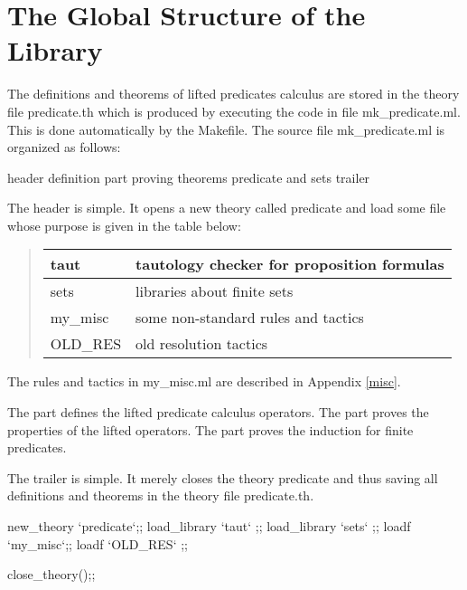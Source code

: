 \chapter{The Global Structure of the Library}
\label{global}

The definitions and theorems of lifted predicates calculus are stored
in the theory file \code{}predicate.th\edoc{} which is produced by executing the
code in file \code{}mk_predicate.ml\edoc{}. This is done automatically by the
\code{}Makefile\edoc{}.  The source file \code{}mk_predicate.ml\edoc{} is organized as
follows:

\enddocs
{}
\endmoddef
\LA{}header\RA{}
\LA{}definition part\RA{}
\LA{}proving theorems\RA{}
\LA{}predicate and sets\RA{}
\LA{}trailer\RA{}
\endcode
{}


The header is simple. It opens a new theory called \code{}predicate\edoc{} and
load some file whose purpose is given in the table below:

\begin{quote}
    \begin{tabular}{|l|l|} \hline
     \code{}taut\edoc{} & tautology checker for proposition formulas \\ \hline
     \code{}sets\edoc{} & libraries about finite sets \\ \hline
     \code{}my_misc\edoc{} & some non-standard rules and tactics \\ \hline
     \code{}OLD_RES\edoc{} & old resolution tactics \\ \hline
    \end{tabular}
\end{quote}

The rules and tactics in \code{}my_misc.ml\edoc{} are described in Appendix
\ref{misc}.  


The  part defines the lifted predicate
calculus operators. The  part proves the
properties of the lifted operators. The  part
proves the induction for finite predicates.

The trailer is simple. It merely closes the theory \code{}predicate\edoc{} and
thus saving all definitions and theorems in the theory file
\code{}predicate.th\edoc{}.

\enddocs
{}
\endmoddef
new_theory `predicate`;;
load_library `taut` ;;
load_library `sets` ;;
loadf `my_misc`;;
loadf `OLD_RES` ;;

\endcode
{}
\endmoddef
close_theory();;
\endcode
{}






